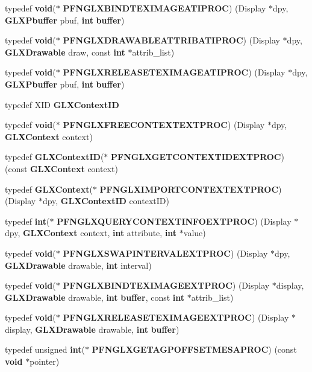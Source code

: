 \begin{DoxyCompactItemize}
\item 
typedef {\bf void}($\ast$ {\bf P\+F\+N\+G\+L\+X\+B\+I\+N\+D\+T\+E\+X\+I\+M\+A\+G\+E\+A\+T\+I\+P\+R\+OC}) (Display $\ast$dpy, {\bf G\+L\+X\+Pbuffer} pbuf, {\bf int} {\bf buffer})
\item 
typedef {\bf void}($\ast$ {\bf P\+F\+N\+G\+L\+X\+D\+R\+A\+W\+A\+B\+L\+E\+A\+T\+T\+R\+I\+B\+A\+T\+I\+P\+R\+OC}) (Display $\ast$dpy, {\bf G\+L\+X\+Drawable} draw, const {\bf int} $\ast$attrib\+\_\+list)
\item 
typedef {\bf void}($\ast$ {\bf P\+F\+N\+G\+L\+X\+R\+E\+L\+E\+A\+S\+E\+T\+E\+X\+I\+M\+A\+G\+E\+A\+T\+I\+P\+R\+OC}) (Display $\ast$dpy, {\bf G\+L\+X\+Pbuffer} pbuf, {\bf int} {\bf buffer})
\item 
typedef X\+ID {\bf G\+L\+X\+Context\+ID}
\item 
typedef {\bf void}($\ast$ {\bf P\+F\+N\+G\+L\+X\+F\+R\+E\+E\+C\+O\+N\+T\+E\+X\+T\+E\+X\+T\+P\+R\+OC}) (Display $\ast$dpy, {\bf G\+L\+X\+Context} context)
\item 
typedef {\bf G\+L\+X\+Context\+ID}($\ast$ {\bf P\+F\+N\+G\+L\+X\+G\+E\+T\+C\+O\+N\+T\+E\+X\+T\+I\+D\+E\+X\+T\+P\+R\+OC}) (const {\bf G\+L\+X\+Context} context)
\item 
typedef {\bf G\+L\+X\+Context}($\ast$ {\bf P\+F\+N\+G\+L\+X\+I\+M\+P\+O\+R\+T\+C\+O\+N\+T\+E\+X\+T\+E\+X\+T\+P\+R\+OC}) (Display $\ast$dpy, {\bf G\+L\+X\+Context\+ID} context\+ID)
\item 
typedef {\bf int}($\ast$ {\bf P\+F\+N\+G\+L\+X\+Q\+U\+E\+R\+Y\+C\+O\+N\+T\+E\+X\+T\+I\+N\+F\+O\+E\+X\+T\+P\+R\+OC}) (Display $\ast$dpy, {\bf G\+L\+X\+Context} context, {\bf int} attribute, {\bf int} $\ast$value)
\item 
typedef {\bf void}($\ast$ {\bf P\+F\+N\+G\+L\+X\+S\+W\+A\+P\+I\+N\+T\+E\+R\+V\+A\+L\+E\+X\+T\+P\+R\+OC}) (Display $\ast$dpy, {\bf G\+L\+X\+Drawable} drawable, {\bf int} interval)
\item 
typedef {\bf void}($\ast$ {\bf P\+F\+N\+G\+L\+X\+B\+I\+N\+D\+T\+E\+X\+I\+M\+A\+G\+E\+E\+X\+T\+P\+R\+OC}) (Display $\ast$display, {\bf G\+L\+X\+Drawable} drawable, {\bf int} {\bf buffer}, const {\bf int} $\ast$attrib\+\_\+list)
\item 
typedef {\bf void}($\ast$ {\bf P\+F\+N\+G\+L\+X\+R\+E\+L\+E\+A\+S\+E\+T\+E\+X\+I\+M\+A\+G\+E\+E\+X\+T\+P\+R\+OC}) (Display $\ast$display, {\bf G\+L\+X\+Drawable} drawable, {\bf int} {\bf buffer})
\item 
typedef unsigned {\bf int}($\ast$ {\bf P\+F\+N\+G\+L\+X\+G\+E\+T\+A\+G\+P\+O\+F\+F\+S\+E\+T\+M\+E\+S\+A\+P\+R\+OC}) (const {\bf void} $\ast$pointer)

\end{DoxyCompactItemize}
